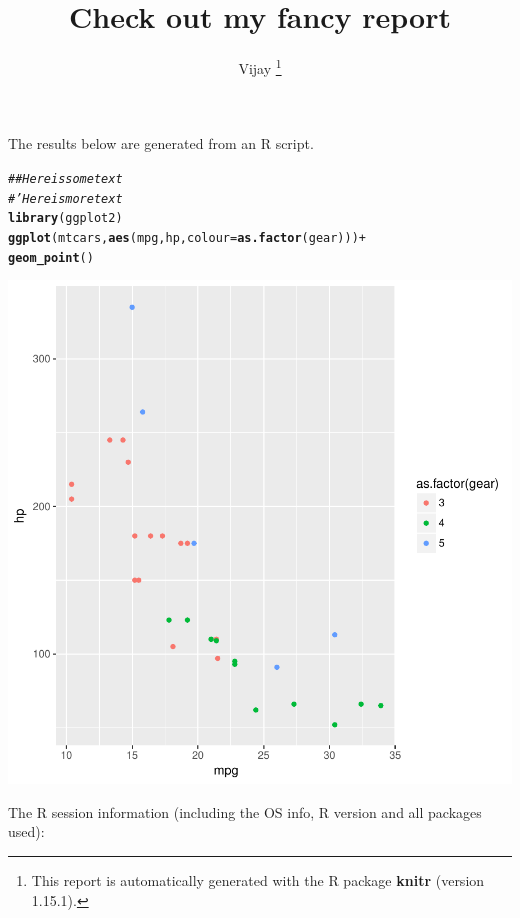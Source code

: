 \documentclass{article}\usepackage[]{graphicx}\usepackage[]{color}
\makeatletter
\newcommand{\hlcom}[1]{\textcolor[rgb]{0.678,0.584,0.686}{\textit{#1}}}%
\newcommand{\hlopt}[1]{\textcolor[rgb]{0,0,0}{#1}}%
\newcommand{\hlstd}[1]{\textcolor[rgb]{0.345,0.345,0.345}{#1}}%
\newcommand{\hlkwc}[1]{\textcolor[rgb]{0.333,0.667,0.333}{#1}}%
\newcommand{\hlkwd}[1]{\textcolor[rgb]{0.737,0.353,0.396}{\textbf{#1}}}%
\newenvironment{kframe}{%
 \def\at@end@of@kframe{}%
 \ifinner\ifhmode%
  \def\at@end@of@kframe{\end{minipage}}%
  \begin{minipage}{\columnwidth}%
 \fi\fi%
 \def\FrameCommand##1{\hskip\@totalleftmargin \hskip-\fboxsep
 \colorbox{shadecolor}{##1}\hskip-\fboxsep
     \hskip-\linewidth \hskip-\@totalleftmargin \hskip\columnwidth}%
 \MakeFramed {\advance\hsize-\width
   \@totalleftmargin\z@ \linewidth\hsize
   \@setminipage}}%
 {\par\unskip\endMakeFramed%
 \at@end@of@kframe}
\newenvironment{knitrout}{}{} %
\makeatother
\begin{document}
\title{ Check out my fancy report}

\author{ Vijay%
\thanks{This report is automatically generated with the R package \textbf{knitr}
        (version 1.15.1).}}

\maketitle
The results below are generated from an R script.

\begin{knitrout}
\color{fgcolor}\begin{kframe}
\begin{alltt}
\hlcom{## Here is some text}
\hlcom{#' Here is more text}
\hlkwd{library}\hlstd{(ggplot2)}
\hlkwd{ggplot}\hlstd{(mtcars,}\hlkwd{aes}\hlstd{(mpg,hp,}\hlkwc{colour}\hlstd{=}\hlkwd{as.factor}\hlstd{(gear)))}\hlopt{+}
        \hlkwd{geom_point}\hlstd{()}
\end{alltt}
\end{kframe}

{\centering \includegraphics[width=.6\linewidth]{figure/my-script-Rnwauto-report-1} 

}



\end{knitrout}

The R session information (including the OS info, R version and all
packages used):
\end{document}
